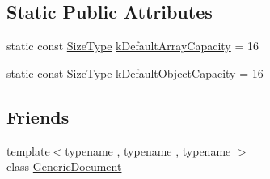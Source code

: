 \subsection*{Static Public Attributes}
\begin{DoxyCompactItemize}
\item 
static const \hyperlink{rapidjson_8h_a5ed6e6e67250fadbd041127e6386dcb5}{Size\+Type} \hyperlink{classGenericValue_a188f57bdb1923c1fefe74baa995871a3}{k\+Default\+Array\+Capacity} = 16
\item 
static const \hyperlink{rapidjson_8h_a5ed6e6e67250fadbd041127e6386dcb5}{Size\+Type} \hyperlink{classGenericValue_a284d018914629aed9a4bd97fe2dc5899}{k\+Default\+Object\+Capacity} = 16
\end{DoxyCompactItemize}
\subsection*{Friends}
\begin{DoxyCompactItemize}
\item 
{\footnotesize template$<$typename , typename , typename $>$ }\\class \hyperlink{classGenericValue_ab05bc9e52e201a2867ea5bac141ee1ae}{Generic\+Document}
\end{DoxyCompactItemize}

